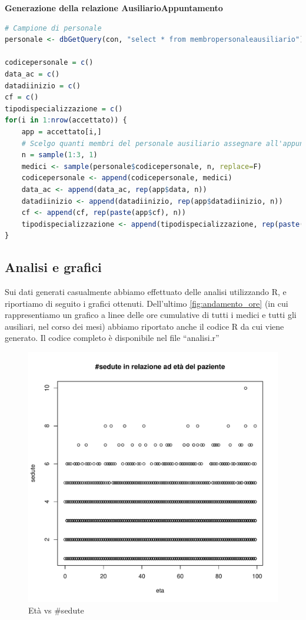 \documentclass[11pt]{article}
\begin{document}
\textbf{Generazione della relazione AusiliarioAppuntamento}
\begin{lstlisting}[language=R]
# Campione di personale
personale <- dbGetQuery(con, "select * from membropersonaleausiliario")

codicepersonale = c()
data_ac = c()
datadiinizio = c()
cf = c()
tipodispecializzazione = c()
for(i in 1:nrow(accettato)) {
    app = accettato[i,]
    # Scelgo quanti membri del personale ausiliario assegnare all'appuntamento
    n = sample(1:3, 1)
    medici <- sample(personale$codicepersonale, n, replace=F)
    codicepersonale <- append(codicepersonale, medici)
    data_ac <- append(data_ac, rep(app$data, n))
    datadiinizio <- append(datadiinizio, rep(app$datadiinizio, n))
    cf <- append(cf, rep(paste(app$cf), n))
    tipodispecializzazione <- append(tipodispecializzazione, rep(paste(app$tipodispecializzazione), n)) #$
}
\end{lstlisting}

\subsection{Analisi e grafici}
Sui dati generati casualmente abbiamo effettuato delle analisi utilizzando R, e riportiamo di seguito i grafici ottenuti. Dell'ultimo \ref{fig:andamento_ore} (in cui rappresentiamo un grafico a linee delle ore cumulative di tutti i medici e tutti gli ausiliari, nel corso dei mesi) abbiamo riportato anche il codice R da cui viene generato.
Il codice completo è disponibile nel file ``analisi.r''

\begin{figure}[H]
    \includegraphics[width=\linewidth]{eta_vs_sedute.pdf}
    \caption{Età vs \#sedute}
    \label{fig:eta_vs_sedute}
\end{figure}
\end{document}
